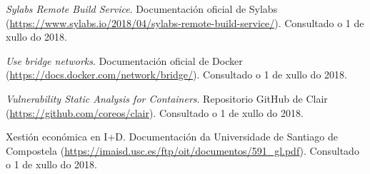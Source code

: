 \begin{thebibliography}{99}
 \textit{Sylabs Remote Build Service}. Documentación oficial de Sylabs (\url{https://www.sylabs.io/2018/04/sylabs-remote-build-service/}). Consultado o 1 de xullo do 2018.

 \textit{Use bridge networks}. Documentación oficial de Docker (\url{https://docs.docker.com/network/bridge/}). Consultado o 1 de xullo do 2018.

 \textit{Vulnerability Static Analysis for Containers}. Repositorio GitHub de Clair (\url{https://github.com/coreos/clair}). Consultado o 1 de xullo do 2018.

 Xestión económica en I+D. Documentación da Universidade de Santiago de Compostela (\url{https://imaisd.usc.es/ftp/oit/documentos/591_gl.pdf}). Consultado o 1 de xullo do 2018.


\end{thebibliography}